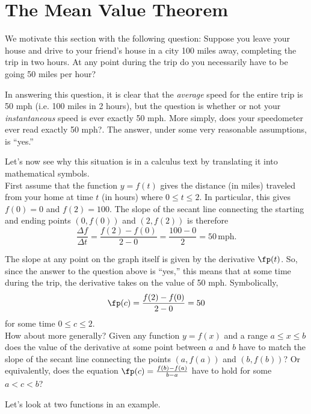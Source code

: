 \section{The Mean Value Theorem}\label{sec:mvt}

We motivate this section with the following question: Suppose you leave your house and drive to your friend's house in a city 100 miles away, completing the trip in two hours.  At any point during the trip do you necessarily have to be going 50 miles per hour?

In answering this question, it is clear that the \textit{average} speed for the entire trip is 50 mph (i.e. 100 miles in 2 hours), but the question is whether or not your \textit{instantaneous} speed is ever exactly 50 mph. More simply, does your speedometer ever read exactly 50 mph?.  The answer, under some very reasonable assumptions, is ``yes.''

Let's now see why this situation is in a calculus text by translating it into mathematical symbols.\\

First assume that the function $y = f(t)$ gives the distance (in miles) traveled from your home at time $t$ (in hours) where $0\le t\le 2$.  In particular, this gives $f(0)=0$ and $f(2)=100$.  The slope of the secant line connecting the starting and ending points $(0,f(0))$ and $(2,f(2))$ is therefore 
$$
\frac{\Delta f}{\Delta t} = \frac{f(2)-f(0)}{2-0} = \frac{100-0}{2} = 50 \, \text{mph}.
$$

The slope at any point on the graph itself is given by the derivative $\fp(t)$.  So, since the answer to the question above is ``yes,'' this means that at some time during the trip, the derivative takes on the value of 50 mph.  Symbolically, 
$$
\fp(c) = \frac{f(2)-f(0)}{2-0} = 50
$$
for some time $0\le c \le 2.$\\

How about more generally?  Given any function $y=f(x)$ and a range $a\le x\le b$ does the value of the derivative at some point between $a$ and $b$ have to match the slope of the secant line connecting the points $(a,f(a))$ and $(b,f(b))$?  Or equivalently, does the equation 
$\fp(c) = \frac{f(b)-f(a)}{b-a}$ have to hold for some $a < c < b$?

Let's look at two functions in an example.\\

